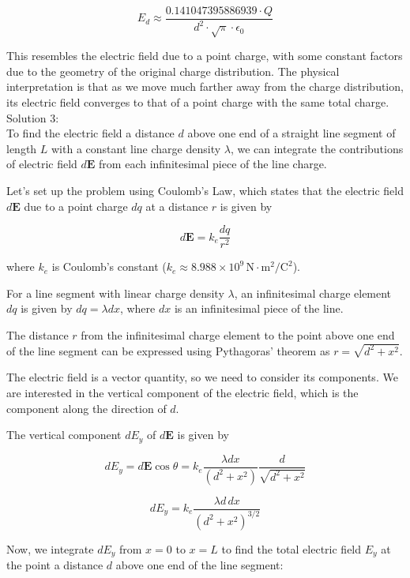 \documentclass[a4paper,11pt]{article}
\begin{document}
\[ E_d \approx \frac{0.141047395886939 \cdot Q}{d^2 \cdot \sqrt{\pi} \cdot \epsilon_0} \]

This resembles the electric field due to a point charge, with some constant factors due to the geometry of the original charge distribution. The physical interpretation is that as we move much farther away from the charge distribution, its electric field converges to that of a point charge with the same total charge. \\

\noindent Solution 3: \\

To find the electric field a distance \( d \) above one end of a straight line segment of length \( L \) with a constant line charge density \( \lambda \), we can integrate the contributions of electric field \( d\mathbf{E} \) from each infinitesimal piece of the line charge.

Let's set up the problem using Coulomb's Law, which states that the electric field \( d\mathbf{E} \) due to a point charge \( dq \) at a distance \( r \) is given by

\[ d\mathbf{E} = k_e \frac{dq}{r^2} \]

where \( k_e \) is Coulomb's constant (\( k_e \approx 8.988 \times 10^9 \, \text{N}\cdot\text{m}^2/\text{C}^2 \)).

For a line segment with linear charge density \( \lambda \), an infinitesimal charge element \( dq \) is given by \( dq = \lambda dx \), where \( dx \) is an infinitesimal piece of the line.

The distance \( r \) from the infinitesimal charge element to the point above one end of the line segment can be expressed using Pythagoras' theorem as \( r = \sqrt{d^2 + x^2} \).

The electric field is a vector quantity, so we need to consider its components. We are interested in the vertical component of the electric field, which is the component along the direction of \( d \).

The vertical component \( dE_y \) of \( d\mathbf{E} \) is given by

\[ dE_y = d\mathbf{E} \cos\theta = k_e \frac{\lambda dx}{(d^2 + x^2)} \frac{d}{\sqrt{d^2 + x^2}} \]

\[ dE_y = k_e \frac{\lambda d\,dx}{(d^2 + x^2)^{3/2}} \]

Now, we integrate \( dE_y \) from \( x = 0 \) to \( x = L \) to find the total electric field \( E_y \) at the point a distance \( d \) above one end of the line segment:
\end{document}
